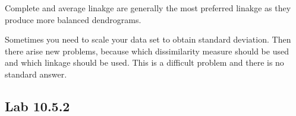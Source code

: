 Complete and average linakge are generally the most preferred linakge as they produce more balanced dendrograms. 

Sometimes you need to scale your data set to obtain standard deviation. Then there arise new problems, because which dissimilarity measure should be used and which linkage should be used. This is a difficult problem and there is no standard answer.

\subsection{Lab 10.5.2}